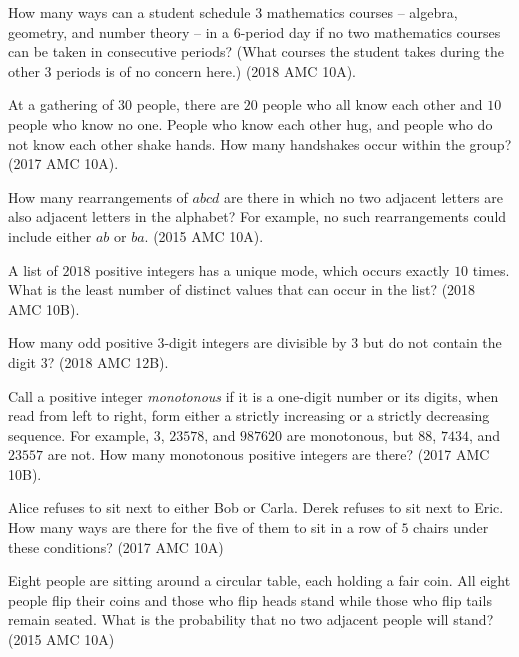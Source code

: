 \documentclass[11pt]{article}
\newcommand{\important}{$\blacktriangleright\,$}
\begin{document}
\begin{problem}[\important 10]
    How many ways can a student schedule 3 mathematics courses -- algebra, geometry, and number theory -- in a 6-period day if no two mathematics courses can be taken in consecutive periods? (What courses the student takes during the other 3 periods is of no concern here.) (2018 AMC 10A).
\end{problem}
\begin{problem}[15]
    At a gathering of $30$ people, there are $20$ people who all know each other and $10$ people who know no one. People who know each other hug, and people who do not know each other shake hands. How many handshakes occur within the group? (2017 AMC 10A).
\end{problem}
\begin{problem}[\important 15]
    How many rearrangements of $abcd$ are there in which no two adjacent letters are also adjacent letters in the alphabet? For example, no such rearrangements could include either $ab$ or $ba$. (2015 AMC 10A).
\end{problem}
\begin{problem}[20]
    A list of $2018$ positive integers has a unique mode, which occurs exactly $10$ times. What is the least number of distinct values that can occur in the list? (2018 AMC 10B).
\end{problem}
\begin{problem}[20]
    How many odd positive 3-digit integers are divisible by 3 but do not contain the digit 3? (2018 AMC 12B).
\end{problem}
\begin{problem}[25]
    Call a positive integer \textit{monotonous} if it is a one-digit number or its digits, when read from left to right, form either a strictly increasing or a strictly decreasing sequence. For example, $3$, $23578$, and $987620$ are monotonous, but $88$, $7434$, and $23557$ are not. How many monotonous positive integers are there? (2017 AMC 10B).
\end{problem}
\begin{problem}[\important 25]
    Alice refuses to sit next to either Bob or Carla. Derek refuses to sit next to Eric. How many ways are there for the five of them to sit in a row of $5$ chairs under these conditions? (2017 AMC 10A)
\end{problem}
\begin{problem}[30]
    Eight people are sitting around a circular table, each holding a fair coin. All eight people flip their coins and those who flip heads stand while those who flip tails remain seated. What is the probability that no two adjacent people will stand? (2015 AMC 10A)
\end{problem}
\end{document}
